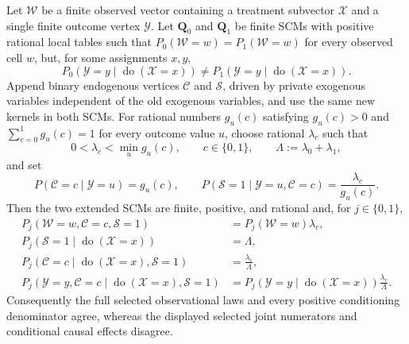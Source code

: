 Let \(\mathcal W\) be a finite observed vector containing a treatment subvector \(\mathcal X\) and a single finite outcome vertex \(\mathcal Y\). Let \(\mathbf Q_0\) and \(\mathbf Q_1\) be finite SCMs with positive rational local tables such that \(P_0(\mathcal W=w)=P_1(\mathcal W=w)\) for every observed cell \(w\), but, for some assignments \(x,y\),
\[
 P_0(\mathcal Y=y\mid\operatorname{do}(\mathcal X=x))
 \ne
 P_1(\mathcal Y=y\mid\operatorname{do}(\mathcal X=x)).
\]
Append binary endogenous vertices \(\mathcal C\) and \(\mathcal S\), driven by private exogenous variables independent of the old exogenous variables, and use the same new kernels in both SCMs. For rational numbers \(g_u(c)\) satisfying \(g_u(c)>0\) and \(\sum_{c=0}^1g_u(c)=1\) for every outcome value \(u\), choose rational \(\lambda_c\) such that
\[
 0<\lambda_c<\min_u g_u(c),
 \qquad c\in\{0,1\},
 \qquad
 \Lambda:=\lambda_0+\lambda_1,
\]
and set
\[
 P(\mathcal C=c\mid\mathcal Y=u)=g_u(c),
 \qquad
 P(\mathcal S=1\mid\mathcal Y=u,\mathcal C=c)
   =\frac{\lambda_c}{g_u(c)}.
\]
Then the two extended SCMs are finite, positive, and rational and, for \(j\in\{0,1\}\),
\[
\begin{aligned}
 P_j(\mathcal W=w,\mathcal C=c,\mathcal S=1)
   &=P_j(\mathcal W=w)\lambda_c,\\
 P_j(\mathcal S=1\mid\operatorname{do}(\mathcal X=x))
   &=\Lambda,\\
 P_j(\mathcal C=c\mid\operatorname{do}(\mathcal X=x),\mathcal S=1)
   &=\frac{\lambda_c}{\Lambda},\\
 P_j(\mathcal Y=y,\mathcal C=c\mid
       \operatorname{do}(\mathcal X=x),\mathcal S=1)
   &=P_j(\mathcal Y=y\mid\operatorname{do}(\mathcal X=x))
     \frac{\lambda_c}{\Lambda}.
\end{aligned}
\]
Consequently the full selected observational laws and every positive conditioning denominator agree, whereas the displayed selected joint numerators and conditional causal effects disagree.

